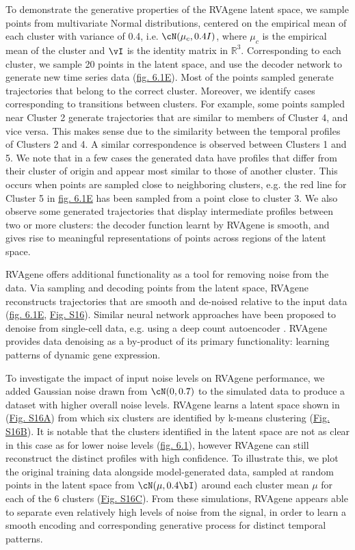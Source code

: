 To demonstrate the generative properties of the RVAgene latent space, we sample points from
multivariate Normal distributions, centered on the empirical mean of each cluster with variance of
0.4, i.e. $\cN(\mu_c, 0.4I)$, where $\mu_c$ is the empirical mean of the cluster and $\vI$ is the
identity matrix in $\mathbb{R}^3$. Corresponding to each cluster, we sample 20 points in the latent
space, and use the decoder network to generate new time series data (\hyperref[fig:fig2]{fig. 6.1E}). Most of the points sampled generate trajectories that belong to the correct cluster. Moreover, we identify cases  corresponding to transitions between clusters. For example, some points sampled near Cluster 2 generate trajectories that are similar to members of Cluster 4, and vice versa. This makes sense due to the similarity between the temporal profiles of Clusters 2 and 4. A similar correspondence is observed between Clusters 1 and 5.
{We note that in a few cases the generated data have profiles that differ from their cluster of
origin and appear most similar to those of another cluster. This occurs when points are sampled
close to neighboring clusters, e.g. the red line for Cluster 5 in \hyperref[fig:fig2]{fig. 6.1E} has been sampled from a point close to cluster 3.}
We also observe some generated trajectories that display intermediate profiles between two or more clusters: the decoder function learnt by RVAgene is smooth, and gives rise to meaningful representations of points across regions of the latent space. 
\par
RVAgene offers additional functionality as a tool for removing noise from the data. Via sampling and
decoding points from the latent space, RVAgene reconstructs trajectories that are smooth and
de-noised relative to the input data (\hyperref[fig:fig2]{fig. 6.1E}, \hyperref[fig:figS1]{Fig. S16}). Similar neural network approaches have been proposed to denoise from single-cell data, e.g. using a deep count autoencoder \citep{eraslan2019single}. RVAgene provides data denoising as a by-product of its primary functionality: learning patterns of dynamic gene expression.
\par
{To investigate the impact of input noise levels on RVAgene performance, we added Gaussian noise
drawn from $\cN(0,0.7)$ to the simulated data to produce a dataset with higher overall noise levels.
RVAgene learns a latent space shown in (\hyperref[fig:figS1]{Fig. S16A}) from which six clusters are
identified by k-means clustering (\hyperref[fig:figS1]{Fig. S16B}). It is notable that the clusters
identified in the latent space are not as clear in this case as for lower noise levels
(\hyperref[fig:fig2]{fig. 6.1}), however RVAgene can still reconstruct the distinct profiles with high confidence. To illustrate this, we plot the original training data alongside model-generated data, sampled at random points in the latent space from  $\cN(\mu,0.4\bI)$ around each cluster mean $\mu$ for each of the 6 clusters (\hyperref[fig:figS1]{Fig. S16C}). From these simulations, RVAgene appears able to separate even relatively high levels of noise from the signal, in order to learn a smooth encoding and corresponding generative process for distinct temporal patterns.}

